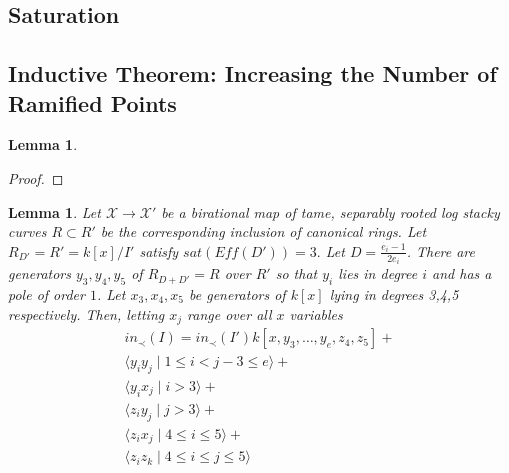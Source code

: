 \documentclass{amsart}
\theoremstyle{plain}
\newtheorem{lem}[thm]{Lemma}
\theoremstyle{definition}
\theoremstyle{remark}
\numberwithin{equation}{section}
\newcommand\ssec{\subsection}
\newcommand \sx{\mathscr X}
\newcommand \subhalf[1]{\frac{{#1} - 1}{2{#1}}}
\begin{document}
\ssec{Saturation}
\label{ssec:g_0_saturation}

\ssec{Inductive Theorem: Increasing the Number of Ramified Points}
\label{ssec:g_0_ram_pts}

\begin{lem}
\label{lem:minimal_quadratic}

\end{lem}
\begin{proof}

\end{proof}

\begin{lem}
\label{sat_three_induction}
Let $\sx \rightarrow \sx'$ be a birational map of tame, separably rooted  log stacky curves $R \subset R'$ be the corresponding inclusion of canonical rings. Let $R_{D'} = R' = k[x]/I'$ satisfy $sat(Eff(D')) = 3.$ Let $D = \subhalf {e_i}$. There are generators $y_3,y_4,y_5$ of $R_{D+D'}= R$ over $R'$ so that $y_i$ lies in degree $i$ and has a pole of order $1$. 
Let $x_3,x_4,x_5$ be generators of $k[x]$ lying in degrees 3,4,5 respectively.  Then, letting $x_j$ range over all $x$ variables
\begin{align*}
	in_\prec(I) = in_\prec(I')k[x,y_3,\ldots, y_e,z_4,z_5] + \\
	\langle y_i y_j \mid 1 \leq i < j-3 \leq e \rangle +\\
	\langle y_i x_j \mid i > 3 \rangle +\\
	\langle z_i y_j \mid j > 3 \rangle  +\\
	\langle z_i x_j \mid 4 \leq i \leq 5\rangle + \\
	\langle z_iz_k \mid 4 \leq i \leq j \leq 5 \rangle 
\end{align*}

\end{lem}
\end{document}
